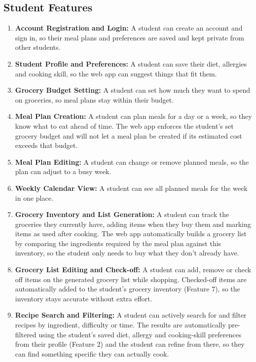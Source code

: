 \documentclass[10pt,letterpaper]{article}
\begin{document}
\subsection{Student Features}
\begin{enumerate}[leftmargin=1.7em]
  \item \textbf{Account Registration and Login:} A student can create an account and sign in, so their meal plans and preferences are saved and kept private from other students.
  \item \textbf{Student Profile and Preferences:} A student can save their diet, allergies and cooking skill, so the web app can suggest things that fit them.
  \item \textbf{Grocery Budget Setting:} A student can set how much they want to spend on groceries, so meal plans stay within their budget.
  \item \textbf{Meal Plan Creation:} A student can plan meals for a day or a week, so they know what to eat ahead of time. The web app enforces the student's set grocery budget and will not let a meal plan be created if its estimated cost exceeds that budget.
  \item \textbf{Meal Plan Editing:} A student can change or remove planned meals, so the plan can adjust to a busy week.
  \item \textbf{Weekly Calendar View:} A student can see all planned meals for the week in one place.
  \item \textbf{Grocery Inventory and List Generation:} A student can track the groceries they currently have, adding items when they buy them and marking items as used after cooking. The web app automatically builds a grocery list by comparing the ingredients required by the meal plan against this inventory, so the student only needs to buy what they don't already have.
  \item \textbf{Grocery List Editing and Check-off:} A student can add, remove or check off items on the generated grocery list while shopping. Checked-off items are automatically added to the student's grocery inventory (Feature 7), so the inventory stays accurate without extra effort.
  \item \textbf{Recipe Search and Filtering:} A student can actively search for and filter recipes by ingredient, difficulty or time. The results are automatically pre-filtered using the student's saved diet, allergy and cooking-skill preferences from their profile (Feature 2) and the student can refine from there, so they can find something specific they can actually cook.

\end{enumerate}
\end{document}
